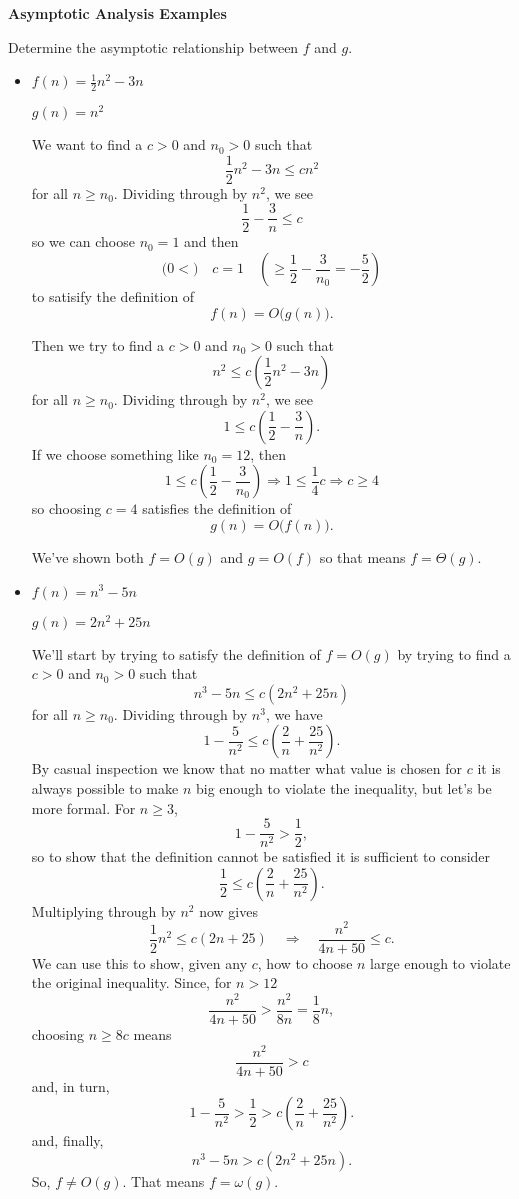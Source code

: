 \documentclass{article}
\begin{document}
{\Large\bf Asymptotic Analysis Examples}

\vspace{1pc}
Determine the asymptotic relationship between $f$ and $g$.

\begin{itemize}
\item
$f(n) = \frac{1}{2}n^2 - 3n$

$g(n) = n^2$

We want to find a $c>0$ and $n_0>0$ such that
\[
  \frac{1}{2}n^2 - 3n \le cn^2
\]
for all $n\ge n_0$.
Dividing through by $n^2$, we see
\[
  \frac{1}{2} - \frac{3}{n} \le c
\]
so we can choose $n_0=1$ and then
\[
  \Big(
  0 <
  \Big)
  \quad
  c = 1
  \quad
  \left(
  \ge
  \frac{1}{2} - \frac{3}{n_0}
  = -\frac{5}{2}
  \right)
\]
to satisify the definition of
\[
  f(n) = O\big(g(n)\big).
\]

Then we try to find a
$c>0$ and $n_0>0$ such that
\[
  n^2 \le c\left(\frac{1}{2}n^2 - 3n\right)
\]
for all $n\ge n_0$.
Dividing through by $n^2$, we see
\[
  1 \le c\left(\frac{1}{2} - \frac{3}{n}\right).
\]
If we choose something like $n_0=12$, then
\[
  1 \le c\left(\frac{1}{2} - \frac{3}{n_0}\right)
\Longrightarrow
  1 \le \frac{1}{4}c
\Longrightarrow
  c \ge 4
\]
so choosing $c=4$ satisfies the definition of
\[
  g(n) = O\big(f(n)\big).
\]

We've shown both
$f=O(g)$
and
$g=O(f)$
so that means
$f=\Theta(g)$.

\vspace{1pc}
\item
$f(n) = n^3 - 5n$

$g(n) = 2n^2 + 25n$

We'll start by trying to satisfy the definition of $f=O(g)$
by trying to find a $c>0$ and $n_0>0$ such that
\[
  n^3 - 5n \le c\left(2n^2 + 25n\right)
\]
for all $n\ge n_0$. Dividing through by $n^3$, we have
\[
  1 - \frac{5}{n^2} \le c\left(\frac{2}{n} + \frac{25}{n^2}\right).
\]
By casual inspection we know that no matter what value is chosen
for $c$ it is always possible to make $n$ big enough to violate
the inequality, but let's be more formal.
For $n\ge3$,
\[
  1 - \frac{5}{n^2} > \frac{1}{2},
\]
so to show that the definition cannot be satisfied it is sufficient
to consider
\[
  \frac{1}{2} \le c\left(\frac{2}{n} + \frac{25}{n^2}\right).
\]
Multiplying through by $n^2$ now gives
\[
  \frac{1}{2}n^2 \le c\left(2n + 25\right)
\quad
\Longrightarrow
\quad
  \frac{n^2}{4n+50} \le c.
\]
We can use this to show, given any $c$, how to choose $n$ large enough to violate the original inequality.
Since, for $n>12$
\[
  \frac{n^2}{4n+50}
  >
  \frac{n^2}{8n}
  =
  \frac{1}{8}n,
\]
choosing $n\ge8c$ means
\[
  \frac{n^2}{4n+50} > c
\]
and, in turn,
\[
  1 - \frac{5}{n^2} > \frac{1}{2} > c\left(\frac{2}{n} + \frac{25}{n^2}\right).
\]
and, finally,
\[
  n^3 - 5n > c\left(2n^2 + 25n\right).
\]
So, $f\ne O(g)$.
That means $f=\omega(g)$.


\end{itemize}
\end{document}
